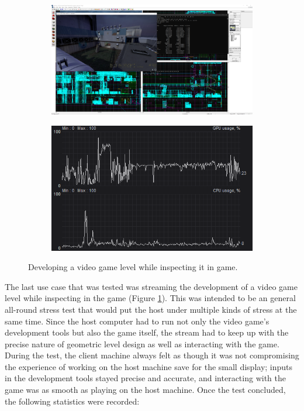 \begin{figure}[t]
  \centering
  \begin{subfigure}{1\textwidth}
    \centering
    \includegraphics[width=.9\linewidth]{Figures/realworld/gamedev}
  \end{subfigure}
  \begin{subfigure}{1\textwidth}
    \centering
    \includegraphics[width=.5\linewidth]{Figures/realworld/gamedevstats}
  \end{subfigure}
  \caption[Streaming the development of a video game level]{Developing a video game level while inspecting it in game.}
  \label{fig:RealWorldGameDev}
\end{figure}

The last use case that was tested was streaming the development of a video game level while inspecting in the game (Figure \ref{fig:RealWorldGameDev}).
This was intended to be an general all-round stress test that would put the host under multiple kinds of stress at the same time.
Since the host computer had to run not only the video game's development tools but also the game itself, the stream had to keep up with the precise nature of geometric level design as well as interacting with the game.
During the test, the client machine always felt as though it was not compromising the experience of working on the host machine save for the small display; inputs in the development tools stayed precise and accurate, and interacting with the game was as smooth as playing on the host machine.
Once the test concluded, the following statistics were recorded:

